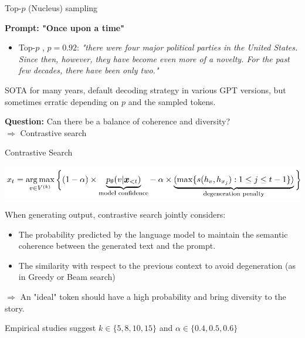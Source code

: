 
\begin{vbframe}{Top-$p$ (Nucleus) sampling}

\vfill
\textbf{Prompt: "Once upon a time"}
\begin{itemize}
    \item Top-$p$ , $p = 0.92$: \textit{"there were four major political parties in the United States. Since then, however, they have become even more of a novelty. For the past few decades, there have been only two."}
\end{itemize}

\vspace{2ex}

SOTA for many years, default decoding strategy in various GPT versions, but sometimes erratic depending on $p$ and the sampled tokens.\\

\vspace{2ex}

\textbf{Question:} Can there be a balance of coherence and diversity?\\
$\Rightarrow$ Contrastive search
  
\end{vbframe}


\begin{frame}{Contrastive Search }

\begin{center}
    \includegraphics[width=1.0\linewidth]{figure/contrastive_search.png}
\end{center}     

When generating output, contrastive search jointly considers:
\begin{itemize}
    \item The probability predicted by the language model to maintain the semantic coherence between the generated text and the prompt.
    \item The similarity with respect to the previous context to avoid  degeneration (as in Greedy or Beam search)
\end{itemize}
   
$\Rightarrow$ An "ideal" token should have a high probability and bring diversity to the story.

Empirical studies suggest $k \in \{5, 8, 10, 15\}$ and $\alpha \in \{0.4, 0.5, 0.6\}$   

\vfill

\end{frame}

